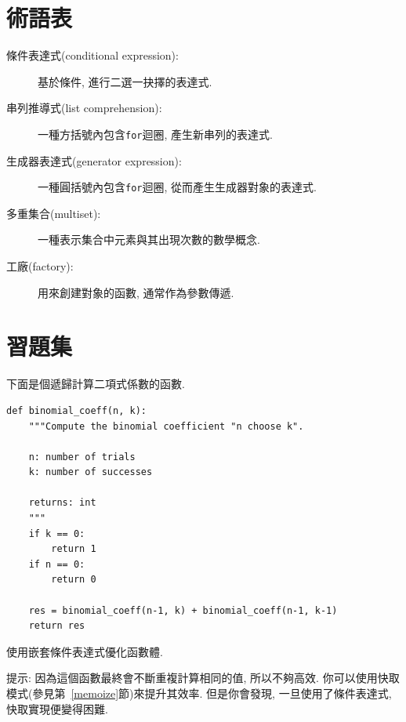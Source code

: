 \documentclass[10pt]{book}
\begin{document}
\section{術語表}

\begin{description}

\item[條件表達式(conditional expression):] 基於條件, 進行二選一抉擇的表達式.

\item[串列推導式(list comprehension):] 一種方括號內包含{\tt for}迴圈, 產生新串列的表達式.

\item[生成器表達式(generator expression):] 一種圓括號內包含{\tt for}迴圈, 
從而產生生成器對象的表達式.  

\item[多重集合(multiset):] 一種表示集合中元素與其出現次數的數學概念.

\item[工廠(factory):] 用來創建對象的函數, 通常作為參數傳遞. 

\end{description}




\section{習題集}

\begin{exercise}

下面是個遞歸計算二項式係數的函數.

\begin{verbatim}
def binomial_coeff(n, k):
    """Compute the binomial coefficient "n choose k".

    n: number of trials
    k: number of successes

    returns: int
    """
    if k == 0:
        return 1
    if n == 0:
        return 0

    res = binomial_coeff(n-1, k) + binomial_coeff(n-1, k-1)
    return res
\end{verbatim}

使用嵌套條件表達式優化函數體.

提示: 因為這個函數最終會不斷重複計算相同的值, 所以不夠高效. 
你可以使用快取模式(參見第~\ref{memoize}節)來提升其效率. 
但是你會發現, 一旦使用了條件表達式, 快取實現便變得困難. 
\end{exercise}
\end{document}
